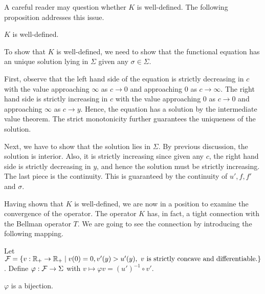 \documentclass[12pt]{article}
\begin{document}
A careful reader may question whether $K$ is 
well-defined. The following proposition addresses 
this issue.
\begin{proposition}
    $K$ is well-defined.
\end{proposition}
\begin{pf}
    To show that $K$ is well-defined, we need to show that 
    the functional equation has an unique solution lying in 
    $\Sigma$ given any $\sigma\in\Sigma$. 

    First, observe that the left hand side of the equation 
    is strictly decreasing in $c$ with the value approaching 
    $\infty$ as $c\to 0$ and approaching $0$ as $c\to \infty$. 
    The right hand side is strictly increasing in $c$ with the 
    value approaching $0$ as $c\to 0$ and approaching $\infty$ 
    as $c\to y$. Hence, the equation has a solution by the 
    intermediate value theorem. The strict monotonicity further 
    guarantees the uniqueness of the solution.

    Next, we have to show that the solution lies in $\Sigma$. 
    By previous discussion, the solution is interior. Also, 
    it is strictly increasing since given any $c$, the right 
    hand side is strictly decreasing in $y$, and hence the 
    solution must be strictly increasing. The last piece is 
    the continuity. This is guaranteed by the continuity of 
    $u', f, f'$ and $\sigma$.
\end{pf}
Having shown that $K$ is well-defined, we are now in a position 
to examine the convergence of the operator. The operator $K$ has, 
in fact, a tight connection with the Bellman operator $T$. 
We are going to see the connection by introducing the following 
mapping. 
\begin{definition}
    Let $\mathcal{F} = \left\{ v:\mathbb{R}_+ \to\mathbb{R}_+ \;\middle\vert\; v(0) = 0, v'(y)>u'(y), 
    \text{ $v$ is strictly concave and differentiable.} \right\}$. 
    Define $\varphi:\mathcal{F} \to\Sigma$ with 
    $v\mapsto \varphi v = (u')^{-1}\circ v'$.
\end{definition}
\begin{proposition}
    $\varphi$ is a bijection.
\end{proposition}
\end{document}
